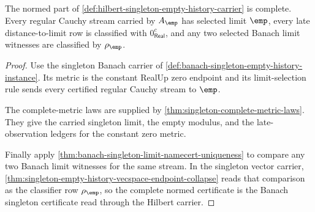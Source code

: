 \begin{theorem}
\label{thm:hilbert-singleton-complete-normed-certificate}
The normed part of
\autoref{def:hilbert-singleton-empty-history-carrier} is complete. Every
regular Cauchy stream carried by $A_{\emp}$ has selected limit $\emp$, every
late distance-to-limit row is classified with $0_{\mathsf{Real}}^{c}$, and any
two selected Banach limit witnesses are classified by $\rho_{\emp}$.
\end{theorem}
\begin{proof}
Use the singleton Banach carrier of
\autoref{def:banach-singleton-empty-history-instance}. Its metric is the
constant RealUp zero endpoint and its limit-selection rule sends every
certified regular Cauchy stream to $\emp$.

The complete-metric laws are supplied by
\autoref{thm:singleton-complete-metric-laws}. They give the carried singleton
limit, the empty modulus, and the late-observation ledgers for the constant
zero metric.

Finally apply
\autoref{thm:banach-singleton-limit-namecert-uniqueness} to compare any two
Banach limit witnesses for the same stream. In the singleton vector carrier,
\autoref{thm:singleton-empty-history-vecspace-endpoint-collapse} reads that
comparison as the classifier row $\rho_{\emp}$, so the complete normed
certificate is the Banach singleton certificate read through the Hilbert
carrier.
\end{proof}


